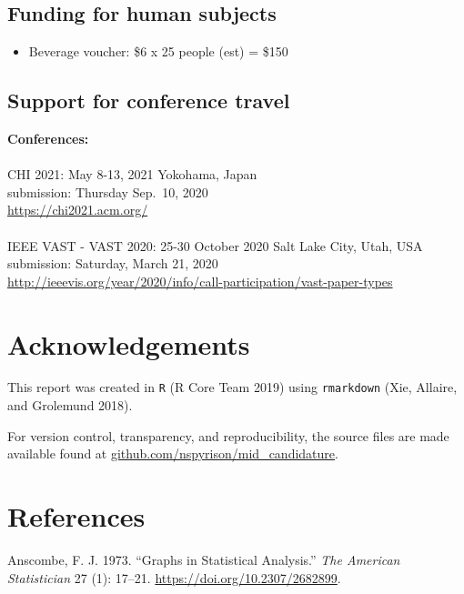 \documentclass[
  11,
]{article}
\providecommand{\tightlist}{%
  \setlength{\itemsep}{0pt}\setlength{\parskip}{0pt}}
\begin{document}
\hypertarget{funding-for-human-subjects}{%
\subsection{Funding for human subjects}\label{funding-for-human-subjects}}

\begin{itemize}
\tightlist
\item
  Beverage voucher: \$6 x 25 people (est) = \$150
\end{itemize}

\hypertarget{support-for-conference-travel}{%
\subsection{Support for conference travel}\label{support-for-conference-travel}}

\textbf{Conferences:}\\
~\\
CHI 2021: May 8-13, 2021 Yokohama, Japan\\
submission: Thursday Sep.~10, 2020\\
\url{https://chi2021.acm.org/}~\\
~\\
IEEE VAST - VAST 2020: 25-30 October 2020 Salt Lake City, Utah, USA\\
submission: Saturday, March 21, 2020\\
\url{http://ieeevis.org/year/2020/info/call-participation/vast-paper-types}

\hypertarget{sec:acknowledgements}{%
\section{Acknowledgements}\label{sec:acknowledgements}}

This report was created in \texttt{R} (R Core Team 2019) using \texttt{rmarkdown} (Xie, Allaire, and Grolemund 2018).

For version control, transparency, and reproducibility, the source files are made available found at \href{https://github.com/nspyrison/mid_candidature}{github.com/nspyrison/mid\_candidature}.

\hypertarget{references}{%
\section*{References}\label{references}}

\hypertarget{refs}{}
\leavevmode\hypertarget{ref-anscombe_graphs_1973}{}%
Anscombe, F. J. 1973. ``Graphs in Statistical Analysis.'' \emph{The American Statistician} 27 (1): 17--21. \url{https://doi.org/10.2307/2682899}.
\end{document}
